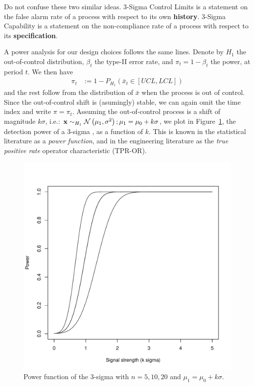 \begin{remark}
Do not confuse these two similar ideas.
3-Sigma Control Limits is a statement on the false alarm rate of a process with respect to its own \textbf{history}.
3-Sigma Capability is a statement on the non-compliance rate of a process with respect to its \textbf{specification}.
\end{remark}


A power analysis for our design choices follows the same lines.
Denote by $H_1$ the out-of-control distribution,  $\beta_t$ the type-II error rate, and $\pi_t=1-\beta_t$ the power, at period $t$.
We then have
\begin{align}
	\pi_t &:= 1-P_{H_1}(\bar{x}_t \in [UCL,LCL])
\end{align}
and the rest follow from the distribution of $\bar{x}$ when the process is out of control.
Since the out-of-control shift is (asumingly) stable, we can again omit the time index and write $\pi=\pi_t$.
Assuming the out-of-control process is a shift of magnitude $k \sigma$, i.e.: $\mathbf{x} \sim_{H_1} \mathcal{N}\left(\mu_1,\sigma^2\right); \mu_1=\mu_0+ k \sigma$, we plot in Figure~\ref{fig:power_function}, the detection power of a 3-sigma \barxChart, as a function of $k$. 
This is known in the statistical literature as a \emph{power function}, and in the engineering literature as the \emph{true positive rate} operator characteristic (TPR-OR).


\begin{figure}[h]
\centering
\includegraphics[height=0.3\textheight]{art/power_function.pdf}
\caption[Power Function]{Power function of the 3-sigma \barxChart with $n=5,10,20$ and $\mu_1=\mu_0 + k \sigma$.}
\label{fig:power_function}
\end{figure}

